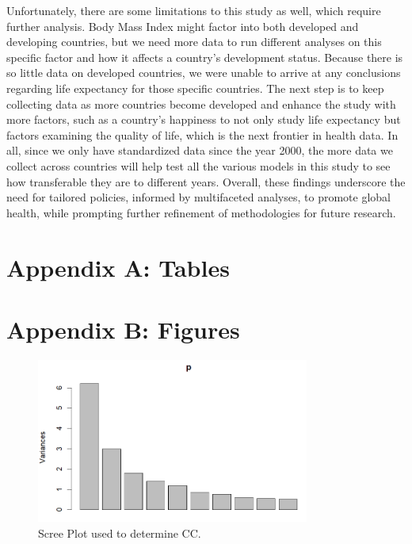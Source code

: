 \documentclass[12pt]{article}
\begin{document}
\begin{multicols}{2}
Unfortunately, there are some limitations to this study as well, which require further analysis. Body Mass Index might factor into both developed and developing countries, but we need more data to run different analyses on this specific factor and how it affects a country’s development status. Because there is so little data on developed countries, we were unable to arrive at any conclusions regarding life expectancy for those specific countries. The next step is to keep collecting data as more countries become developed and enhance the study with more factors, such as a country’s happiness to not only study life expectancy but factors examining the quality of life, which is the next frontier in health data. In all, since we only have standardized data since the year 2000, the more data we collect across countries will help test all the various models in this study to see how transferable they are to different years. Overall, these findings underscore the need for tailored policies, informed by multifaceted analyses, to promote global health, while prompting further refinement of methodologies for future research.



\nocite{*}




    
\end{multicols}

\newpage
\appendix

\section{Appendix A: Tables}





\newpage
\section{Appendix B: Figures}

\begin{figure}[h]
    \centering
    \includegraphics[width=0.8\textwidth]{images/figure_1.png}
    \caption{Scree Plot used to determine CC.}
    \label{fig:figure_1}
\end{figure}
\end{document}
